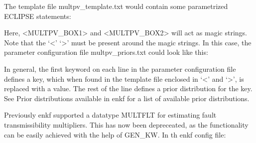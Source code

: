 \documentclass[a4paper,10pt,english]{sphinxmanual}
\begin{document}
\begin{sphinxShadowBox}
%
\begin{sphinxVerbatim}[commandchars=\\\{\}]
  
\end{sphinxVerbatim}

The template file multpv\_template.txt would contain some parametrized ECLIPSE
statements:

%
\begin{sphinxVerbatim}[commandchars=\\\{\}]
       
  

       
  
\end{sphinxVerbatim}

Here, \textless{}MULTPV\_BOX1\textgreater{} and \textless{}MULTPV\_BOX2\textgreater{} will act as magic strings. Note that the
‘\textless{}’ ‘\textgreater{}’ must be present around the magic strings. In this case, the parameter
configuration file multpv\_priors.txt could look like this:

%
\begin{sphinxVerbatim}[commandchars=\\\{\}]
   
   
\end{sphinxVerbatim}

In general, the first keyword on each line in the parameter configuration file
defines a key, which when found in the template file enclosed in ‘\textless{}’ and ‘\textgreater{}’,
is replaced with a value. The rest of the line defines a prior distribution
for the key. See Prior distributions available in enkf for a list of available
prior distributions.


Previously enkf supported a datatype MULTFLT for estimating fault
transmissibility multipliers. This has now been depreceated, as the
functionality can be easily achieved with the help of GEN\_KW. In th enkf
config file:


\end{sphinxShadowBox}
\end{document}
